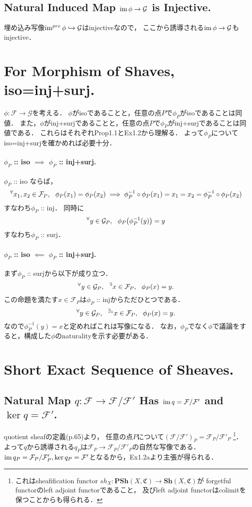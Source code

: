 \documentclass[a4paper]{jsarticle}
\newcommand{\shF}{\mathcal{F}}
\newcommand{\shG}{\mathcal{G}}
\begin{document}
    \subsection{Natural Induced Map $\im \phi \to \shG$ is Injective.}
    埋め込み写像$\im^{pre} \phi \hookrightarrow \shG$はinjectiveなので，
    ここから誘導される$\im \phi \to \shG$もinjective．

\section{For Morphism of Shaves, iso=inj+surj.} %
    $\phi: \shF \to \shG$を考える．
    $\phi$がisoであることと，任意の点$P$で$\phi_P$がisoであることは同値．
    また，$\phi$がinj+surjであることと，任意の点$P$で$\phi_P$がinj+surjであることは同値である．
    これらはそれぞれProp1.1とEx1.2から理解る．
    よって$\phi_P$についてiso=inj+surjを確かめれば必要十分．
    
    \paragraph{$\phi_P$ :: iso $\implies$ $\phi_P$ :: inj+surj.}
    $\phi_P$ :: iso ならば，
    \[
        \Forall{x_1, x_2 \in \shF_P}
        \phi_P(x_1)=\phi_P(x_2)
        \implies
        \phi_P^{-1} \circ \phi_P(x_1)=x_1=x_2=\phi_P^{-1} \circ \phi_P(x_2)
        \label{prop:ex15-inj}
    \]
    すなわち$\phi_P$ :: inj．
    同時に
    \[ \Forall{y \in \shG_P} \phi_P \big( \phi_P^{-1}(y) \big)=y \]
    すなわち$\phi_P$ :: surj．

    \paragraph{$\phi_P$ :: iso $\impliedby$ $\phi_P$ :: inj+surj.}
    まず$\phi_P$ :: surjから以下が成り立つ．
    \[ \Forall{y \in \shG_P} \Exists{x \in \shF_P} \phi_P(x)=y. \]
    この命題を満たす$x \in \shF_P$は$\phi_P$ :: injからただひとつである．
    \[ \Forall{y \in \shG_P} {}^{\exists_1} x \in \shF_P,~~ \phi_P(x)=y. \]
    なので$\phi_P^{-1}(y)=x$と定めればこれは写像になる．
    なお，$\phi_P$でなく$\phi$で議論をすると，構成した$\phi$のnaturalityを示す必要がある．

\section{Short Exact Sequence of Sheaves.} %
    \subsection{Natural Map $q:\shF \to \shF/\shF'$ Has $\im q=\shF/\shF'$ and $\ker q=\shF'$.}
    quotient sheafの定義(p.65)より，
    任意の点$P$について$(\shF/\shF')_P=\shF_P/\shF'_P$
    \footnote
    {
        これはsheafification functor $sh_X: \mathbf{PSh}(X, \mathfrak{C}) \to \mathbf{Sh}(X, \mathfrak{C})$が
        forgetful functorのleft adjoint functorであること，
        及びleft adjoint functorはcolimitを保つことからも得られる．
    }．
    よって$q$から誘導される$q_P$は$\shF_P \to \shF_P/\shF'_P$の自然な写像である．
    $\im q_P=\shF_P/\shF'_P, \ker q_P=\shF'$となるから，Ex1.2aより主張が得られる．
\end{document}
